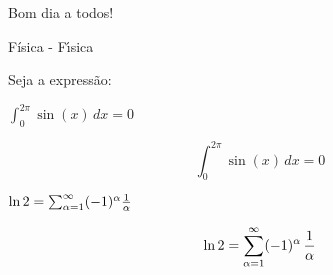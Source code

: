 \documentclass[12pt]{article}
\begin{document}
Bom dia a todos!

F\'{i}sica - F\'{\i}sica

Seja a express\~{a}o:
\par
$\int_0^{2\pi} \sin(x)\,dx = 0$
\par
$$\int_0^{2\pi} \sin(x)\,dx = 0$$
\par
$\ln 2 = \sum_{\alpha = 1}^\infty (-1)^\alpha {1 \over \alpha}$
\par
$$\ln 2 = \sum_{\alpha = 1}^\infty (-1)^\alpha\,{1 \over \alpha}$$
\end{document}
